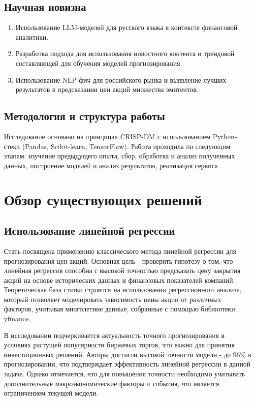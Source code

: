 \documentclass[12pt, a4paper]{article}
\begin{document}
\subsection{Научная новизна}
\begin{enumerate}
  \item Использование LLM-моделей для русского языка в контексте финансовой аналитики.

  \item Разработка подхода для использования новостного контента и трендовой составляющей для обучения моделей прогнозирования.

  \item Использование NLP-фич для российского рынка и выявление лучших результатов в предсказании цен акций множества эмитентов.
\end{enumerate}

\subsection{Методология и структура работы}
Исследование основано на принципах CRISP-DM с использованием Python-стекa (Pandas, Scikit-learn, TensorFlow). Работа проходила по следующим этапам: изучение предыдущего опыта, сбор, обработка и анализ полученных данных, построение моделей и анализ результатов, реализация сервиса.

\section{Обзор существующих решений}

\subsection{Использование линейной регрессии}
Стать \cite{linreg} посвящена применению классического метода линейной регрессии для прогнозирования цен акций. Основная цель - проверить гипотезу о том, что линейная регрессия способна с высокой точностью предсказать цену закрытия акций на основе исторических данных и финансовых показателей компаний. Теоретическая база статьи строится на использовании регрессионного анализа, который позволяет моделировать зависимость цены акции от различных факторов, учитывая многолетние данные, собранные с помощью библиотеки yfinance.

В исследовании подчеркивается актуальность точного прогнозирования в условиях растущей популярности биржевых торгов, что важно для принятия инвестиционных решений. Авторы достигли высокой точности модели - до 96\% в прогнозировании, что подтверждает эффективность линейной регрессии в данной задаче. Однако отмечается, что для повышения точности необходимо учитывать дополнительные макроэкономические факторы и события, что является ограничением текущей модели.
\end{document}
